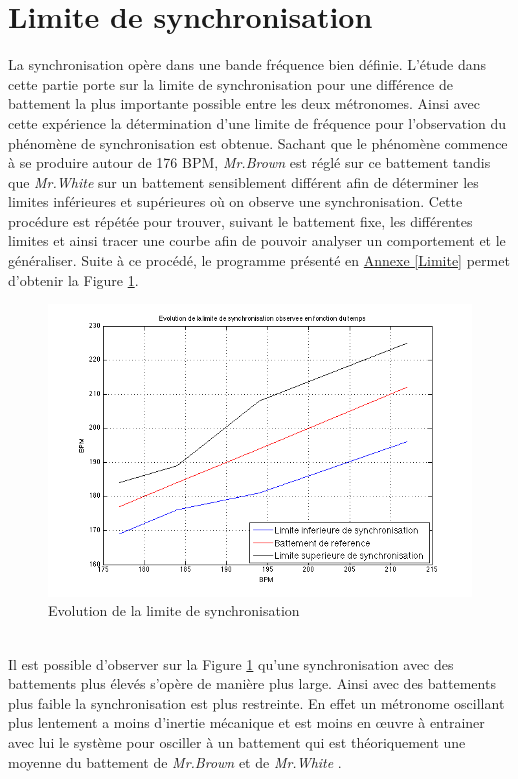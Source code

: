 \documentclass[a4paper,11pt]{report}
\begin{document}
\section{Limite de synchronisation}
La synchronisation opère dans une bande fréquence bien définie. L'étude dans cette partie porte sur la limite de synchronisation pour une différence de battement la plus importante possible entre les deux métronomes. Ainsi avec cette expérience la détermination d'une limite de fréquence pour l'observation du phénomène de synchronisation est obtenue. Sachant que le phénomène commence à se produire autour de 176 BPM, {\it Mr.Brown} est réglé sur ce battement tandis que {\it Mr.White} sur un battement sensiblement différent afin de déterminer les limites inférieures et supérieures où on observe une synchronisation. Cette procédure est répétée pour trouver, suivant le battement fixe, les différentes limites et ainsi tracer une courbe afin de pouvoir analyser un comportement et le généraliser. Suite à ce procédé, le programme présenté en \underline{Annexe \ref{Limite}} permet d'obtenir la Figure \ref{LimiteF}.
\begin{figure}[h]
\centering
\includegraphics[width=1\textwidth]{CourbeLimiteSynchro}
\caption{Evolution de la limite de synchronisation}\label{LimiteF}
\end{figure}\\
Il est possible d'observer sur la Figure \ref{LimiteF} qu'une synchronisation avec des battements plus élevés s'opère de manière plus large. Ainsi avec des battements plus faible la synchronisation est plus restreinte. En effet un métronome oscillant plus lentement a moins d'inertie mécanique et est moins en œuvre à entrainer avec lui le système pour osciller à un battement qui est théoriquement une moyenne du battement de {\it Mr.Brown} et de {\it Mr.White} \cite{piko}.
\end{document}
